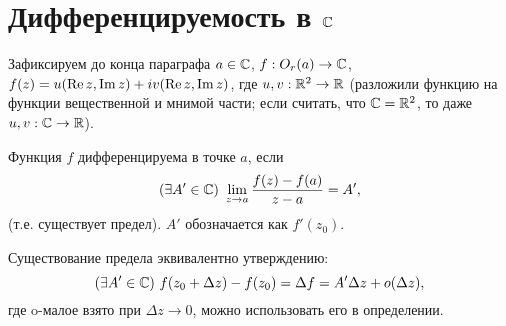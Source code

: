 \section{Дифференцируемость в $\mathbb{C}$}

Зафиксируем до конца параграфа $a \in \mathbb{C}$, $f: O_r(a) \to \mathbb{C}$, $f(z) = u(\operatorname{Re} z, \operatorname{Im} z) + i v(\operatorname{Re} z, \operatorname{Im} z)$, где $u, v: \mathbb{R}^2 \to \mathbb{R}$ (разложили функцию на функции вещественной и мнимой части; если считать, что $\mathbb{C} = \mathbb{R}^2$, то даже $u, v: \mathbb{C} \to \mathbb{R}$).

\begin{definition}
	Функция $f$ дифференцируема в точке $a$, если
	\[
	(\exists A' \in \mathbb{C}) \,\, \lim\limits_{z \to a} \frac{f(z) - f(a)}{z - a} = A',
	\]
	(т.е. существует предел). $A'$ обозначается как $f'(z_0)$.
\end{definition}
\begin{note}
	Существование предела эквивалентно утверждению:
	\[
		(\exists A' \in \mathbb{C}) \,\, f(z_0 + \Delta z) - f(z_0) = \Delta f = A' \Delta z + o(\Delta z),
	\]
	где o-малое взято при $\Delta z \to 0$, можно использовать его в определении.	
\end{note}


